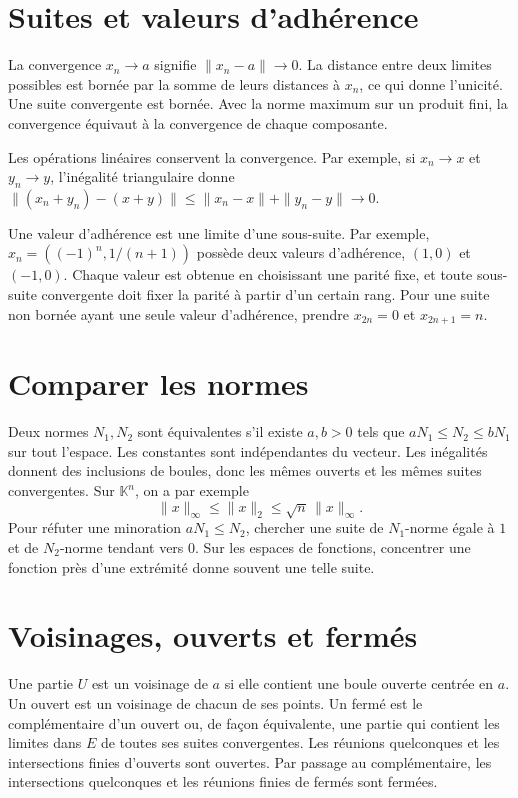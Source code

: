 \documentclass[11pt,a4paper]{article}
\begin{document}
\section*{Suites et valeurs d’adhérence}
La convergence $x_n\to a$ signifie $\|x_n-a\|\to0$. La distance entre deux limites possibles est bornée par la somme de leurs distances à $x_n$, ce qui donne l’unicité. Une suite convergente est bornée. Avec la norme maximum sur un produit fini, la convergence équivaut à la convergence de chaque composante.

Les opérations linéaires conservent la convergence. Par exemple, si $x_n\to x$ et $y_n\to y$, l’inégalité triangulaire donne $\|(x_n+y_n)-(x+y)\|\le\|x_n-x\|+\|y_n-y\|\to0$.

Une valeur d’adhérence est une limite d’une sous-suite. Par exemple, $x_n=((-1)^n,1/(n+1))$ possède deux valeurs d’adhérence, $(1,0)$ et $(-1,0)$. Chaque valeur est obtenue en choisissant une parité fixe, et toute sous-suite convergente doit fixer la parité à partir d’un certain rang. Pour une suite non bornée ayant une seule valeur d’adhérence, prendre $x_{2n}=0$ et $x_{2n+1}=n$.

\section*{Comparer les normes}
Deux normes $N_1,N_2$ sont équivalentes s’il existe $a,b>0$ tels que $aN_1\le N_2\le bN_1$ sur tout l’espace. Les constantes sont indépendantes du vecteur. Les inégalités donnent des inclusions de boules, donc les mêmes ouverts et les mêmes suites convergentes. Sur $\mathbb K^n$, on a par exemple
\[ \|x\|_\infty\le\|x\|_2\le\sqrt n\,\|x\|_\infty. \]
Pour réfuter une minoration $aN_1\le N_2$, chercher une suite de $N_1$-norme égale à $1$ et de $N_2$-norme tendant vers $0$. Sur les espaces de fonctions, concentrer une fonction près d’une extrémité donne souvent une telle suite.

\section*{Voisinages, ouverts et fermés}
Une partie $U$ est un voisinage de $a$ si elle contient une boule ouverte centrée en $a$. Un ouvert est un voisinage de chacun de ses points. Un fermé est le complémentaire d’un ouvert ou, de façon équivalente, une partie qui contient les limites dans $E$ de toutes ses suites convergentes. Les réunions quelconques et les intersections finies d’ouverts sont ouvertes. Par passage au complémentaire, les intersections quelconques et les réunions finies de fermés sont fermées.
\end{document}
